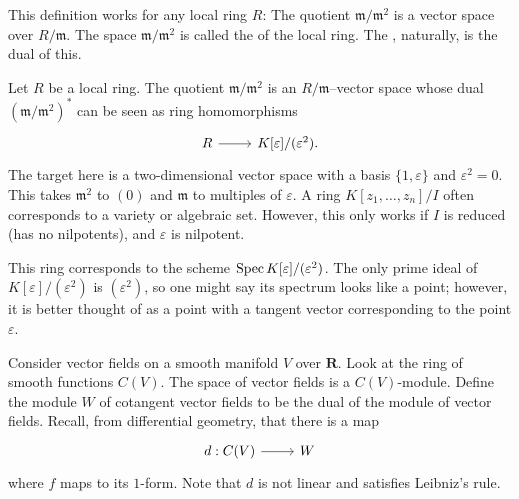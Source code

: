 \documentclass [11 pt, oneside] {article}
\begin{document}
\begin{remark}
	This definition works for any local ring $R$: The quotient $\mathfrak{m}/\mathfrak{m}^2$ is a vector space over $R/\mathfrak{m}$. The space $\mathfrak{m}/\mathfrak{m}^2$ is called the  of the local ring. The , naturally, is the dual of this.
\end{remark}

Let $R$ be a local ring. The quotient $\mathfrak{m}/\mathfrak{m}^2$ is an $R/\mathfrak{m}$--vector space whose dual $(\mathfrak{m}/\mathfrak{m}^2) ^*$ can be seen as ring homomorphisms 
\[
\begin{tikzcd}
R\ar[r]& K[\varepsilon]/(\varepsilon^2).
\end{tikzcd}
\] 
The target here is a two-dimensional vector space with a basis $\{1,\varepsilon\}$ and $\varepsilon^2=0$. This takes $\mathfrak{m}^2$ to $(0)$ and $\mathfrak{m}$ to multiples of $\varepsilon$. A ring $K[z_1,\hdots, z_n]/I$ often corresponds to a variety or algebraic set. However, this only works if $I$ is reduced (has no nilpotents), and $\varepsilon$ is nilpotent. 

This ring corresponds to the scheme $\operatorname{Spec} K[\varepsilon]/(\varepsilon^2)$. The only prime ideal of $K[\varepsilon]/(\varepsilon^2)$ is $(\varepsilon^2)$, so one might say its spectrum looks like a point; however, it is better thought of as a point with a tangent vector corresponding to the point $\varepsilon$.

Consider vector fields on a smooth manifold $V$ over $\mathbf{R}$. Look at the ring of smooth functions $C(V)$. The space of vector fields is a $C(V)$-module. Define the module $W$ of cotangent vector fields to be the dual of the module of vector fields. Recall, from differential geometry, that there is a map
\[
\begin{tikzcd}
d:C(V) \ar[r]& W
\end{tikzcd}
\] 
where $f$ maps to its $1$-form. Note that $d$ is not linear and satisfies Leibniz's rule. 
\end{document}
